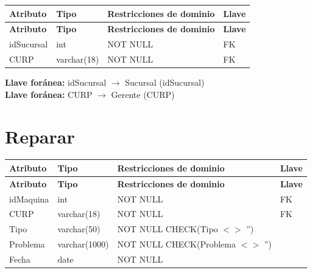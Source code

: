 \documentclass[12pt]{article}
\begin{document}
\begin{longtable}{p{3.5cm} p{2.5cm} p{7.5cm} p{1.5cm}}
\label{tab:administrar}\\
\toprule
\textbf{Atributo} & \textbf{Tipo} & \textbf{Restricciones de dominio} & \textbf{Llave} \\
\midrule
\endfirsthead

\toprule
\textbf{Atributo} & \textbf{Tipo} & \textbf{Restricciones de dominio} & \textbf{Llave} \\
\midrule
\endhead
\bottomrule
\endfoot

idSucursal 
& int 
& NOT NULL 
& FK \\

CURP 
& varchar(18) 
& NOT NULL 
& FK \\

\end{longtable}

\vspace{2pt}
\textbf{Llave foránea:} idSucursal $\rightarrow$ Sucursal (idSucursal)\\
\textbf{Llave foránea:} CURP $\rightarrow$ Gerente (CURP)\\


\section*{Reparar}

\begin{longtable}{p{3.5cm} p{2.5cm} p{7.5cm} p{1.5cm}}
\label{tab:reparar}\\
\toprule
\textbf{Atributo} & \textbf{Tipo} & \textbf{Restricciones de dominio} & \textbf{Llave} \\
\midrule
\endfirsthead

\toprule
\textbf{Atributo} & \textbf{Tipo} & \textbf{Restricciones de dominio} & \textbf{Llave} \\
\midrule
\endhead
\bottomrule
\endfoot

idMaquina 
& int 
& NOT NULL 
& FK \\

CURP 
& varchar(18) 
& NOT NULL 
& FK \\

Tipo 
& varchar(50) 
& NOT NULL \newline CHECK(Tipo $<>$ '')
& \\

Problema 
& varchar(1000) 
& NOT NULL \newline CHECK(Problema $<>$ '')
& \\

Fecha 
& date 
& NOT NULL 
& \\

\end{longtable}
\end{document}
